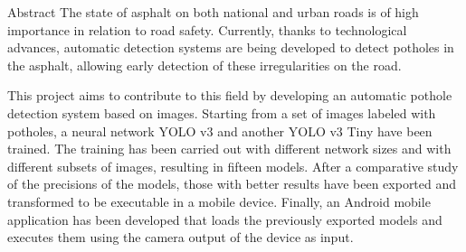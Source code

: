 \begin{poliabstract}{Abstract}
\noindent
The state of asphalt on both national and urban roads is of high importance in relation to road safety. Currently, thanks to technological advances, automatic detection systems are being developed to detect potholes in the asphalt, allowing early detection of these irregularities on the road.

\doublespacing\singlespacing
\noindent
This project aims to contribute to this field by developing an automatic pothole detection system based on images. Starting from a set of images labeled with potholes, a neural network YOLO v3 and another YOLO v3 Tiny have been trained. The training has been carried out with different network sizes and with different subsets of images, resulting in fifteen models. After a comparative study of the precisions of the models, those with better results have been exported and transformed to be executable in a mobile device. Finally, an Android mobile application has been developed that loads the previously exported models and executes them using the camera output of the device as input.
\end{poliabstract}